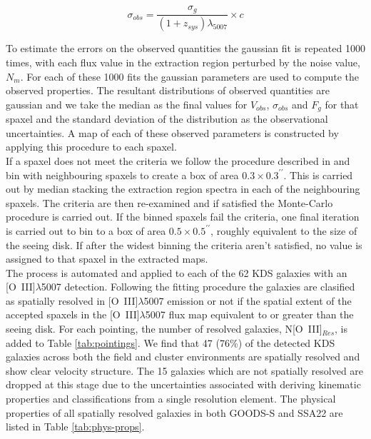 \documentclass[fleqn,usenatbib]{mn2e}
\begin{document}
\begin{equation}\label{eq:dispersion_comp}
   \sigma_{obs} = \frac{\sigma_{g}}{(1 + z_{sys})\lambda_{5007}} \times c
\end{equation}

To estimate the errors on the observed quantities the gaussian fit is repeated 1000 times, with each flux value in the extraction region perturbed by the noise value, $N_{m}$.
For each of these 1000 fits the gaussian parameters are used to compute the observed properties.
The resultant distributions of observed quantities are gaussian and we take the median as the final values for $V_{obs}$, $\sigma_{obs}$ and $F_{g}$ for that spaxel and the standard deviation of the distribution as the observational uncertainties.
A map of each of these observed parameters is constructed by applying this procedure to each spaxel. \\

If a spaxel does not meet the criteria we follow the procedure described in \cite{Stott2016} and bin with neighbouring spaxels to create a box of area $0.3\times0.3^{\prime\prime}$.
This is carried out by median stacking the extraction region spectra in each of the neighbouring spaxels.
The criteria are then re-examined and if satisfied the Monte-Carlo procedure is carried out. 
If the binned spaxels fail the criteria, one final iteration is carried out to bin to a box of area $0.5\times0.5^{\prime\prime}$, roughly equivalent to the size of the seeing disk.
If after the widest binning the criteria aren't satisfied, no value is assigned to that spaxel in the extracted maps. \\

The process is automated and applied to each of the 62 KDS galaxies with an [O~{\sc III}]$\lambda$5007 detection.
Following the fitting procedure the galaxies are clasified as spatially resolved in [O~{\sc III}]$\lambda$5007 emission or not if the spatial extent of the accepted spaxels in the [O~{\sc III}]$\lambda$5007 flux map equivalent to or greater than the seeing disk.
For each pointing, the number of resolved galaxies, N[O~{\sc III}]$_{Res}$, is added to Table \ref{tab:pointings}.
We find that 47 (76\%) of the detected KDS galaxies across both the field and cluster environments are spatially resolved and show clear velocity structure.
The 15 galaxies which are not spatially resolved are dropped at this stage due to the uncertainties associated with deriving kinematic properties and classifications from a single resolution element.
The physical properties of all spatially resolved galaxies in both GOODS-S and SSA22 are listed in Table \ref{tab:phys-props}. \\ 
\end{document}
